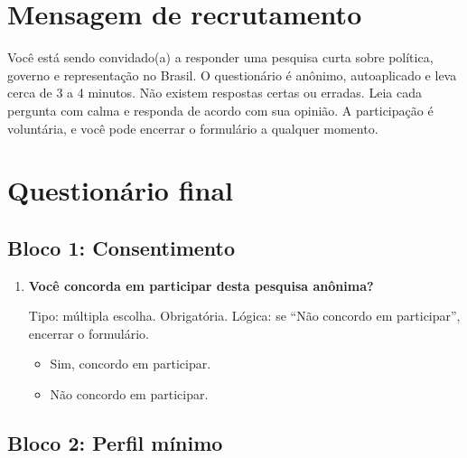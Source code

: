 \documentclass[11pt,a4paper]{article}
\begin{document}
\section*{Mensagem de recrutamento}

Você está sendo convidado(a) a responder uma pesquisa curta sobre política, governo e representação no Brasil. O questionário é anônimo, autoaplicado e leva cerca de 3 a 4 minutos. Não existem respostas certas ou erradas. Leia cada pergunta com calma e responda de acordo com sua opinião. A participação é voluntária, e você pode encerrar o formulário a qualquer momento.

\section*{Questionário final}

\subsection*{Bloco 1: Consentimento}

\begin{enumerate}
\item \textbf{Você concorda em participar desta pesquisa anônima?}

Tipo: múltipla escolha. Obrigatória. Lógica: se ``Não concordo em participar'', encerrar o formulário.
\begin{itemize}
\item Sim, concordo em participar.
\item Não concordo em participar.
\end{itemize}
\end{enumerate}

\subsection*{Bloco 2: Perfil mínimo}
\end{document}
